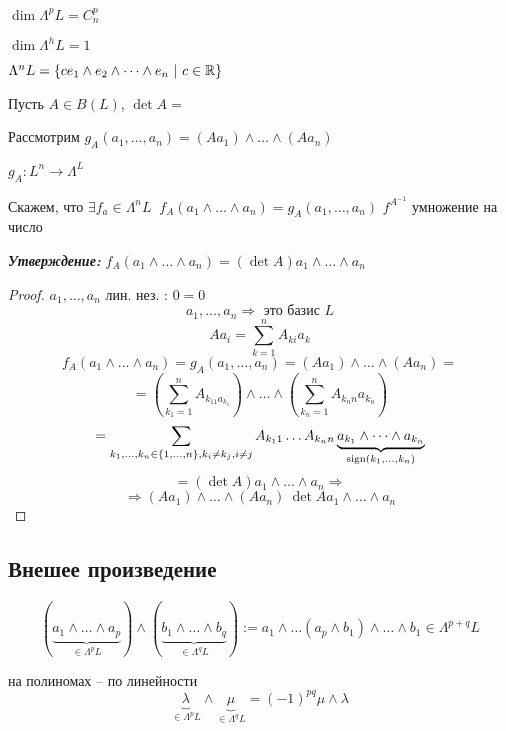     \par $ $
    \par $\dim \Lambda^p L = C_n^p$
    \par $\dim \Lambda^h L = 1$
    \par $\Lambda^n L = \{c e_1 \wedge e_2 \wedge \dots \wedge e_n \ | \ c \in \mathbb{R} \}$
    \par Пусть $A \in B(L)$, $\det A = $
    \par Рассмотрим $g_A(a_1, \dots, a_n) = (Aa_1) \wedge \dots \wedge (Aa_n)$
    \par $g_A : L^n \rightarrow \Lambda^ L$
    \par Скажем, что $\exists f_a \in \Lambda^n L \ $ $f_A(a_1 \wedge \dots \wedge a_n) = g_A(a_1, \dots, a_n)$ \quad $f^{A^{-1}}$ умножение на число
    
    \par \textbf{\textit{Утверждение: }} $f_A(a_1 \wedge \dots \wedge a_n) = (\det A) a_1 \wedge \dots \wedge a_n$
    \begin{proof}
        $a_1, \dots, a_n$ лин. нез. : $0 = 0$
        \[
            a_1, \dots, a_n \Rightarrow \text{ это базис } L   
        \]
        \[
            Aa_i = \sum_{k=1}^{n} A_{ki}a_k    
        \]
        \[
            f_A(a_1 \wedge \dots \wedge a_n) = g_A(a_1, \dots, a_n) = (Aa_1) \wedge \dots \wedge (Aa_n) =    
        \]
        \[
            = \left(\sum_{k_1 = 1}^n A_{k_11 a_{k_1}}\right) \wedge \dots \wedge \left(\sum_{k_n = 1}^n A_{k_nn} a_{k_n}\right)    
        \]
        \[
            = \sum_{k_1, \dots, k_n \in \{1, \dots, n\}, k_i \not= k_j, i \not= j} A_{k_11} \dots A_{k_nn} \underbrace{a_{k_1} \wedge \dots \wedge a_{k_n}}_{\operatorname{sign} (k_1, \dots, k_n)}
        \]
        \[
            = (\det A) a_1 \wedge \dots \wedge a_n \Rightarrow
        \]
        \[
            \Rightarrow (Aa_1) \wedge \dots \wedge (Aa_n) \ \det A a_1 \wedge \dots \wedge a_n
        \]
    \end{proof}

    \subsection*{Внешее произведение}

    \[
        (\underbrace{a_1 \wedge \dots \wedge a_p}_{\in \Lambda^p L}) \wedge (\underbrace{b_1 \wedge \dots \wedge b_q}_{\in \Lambda^q L}) := a_1 \wedge \dots (a_p \wedge b_1) \wedge \dots \wedge b_1 \in \Lambda^{p+q} L    
    \]
    \par на полиномах -- по линейности
    \[
        \underbrace{\lambda}_{\in \Lambda^p L} \wedge \underbrace{\mu}_{\in \Lambda^q L} = (-1)^{pq}\mu \wedge \lambda    
    \]

